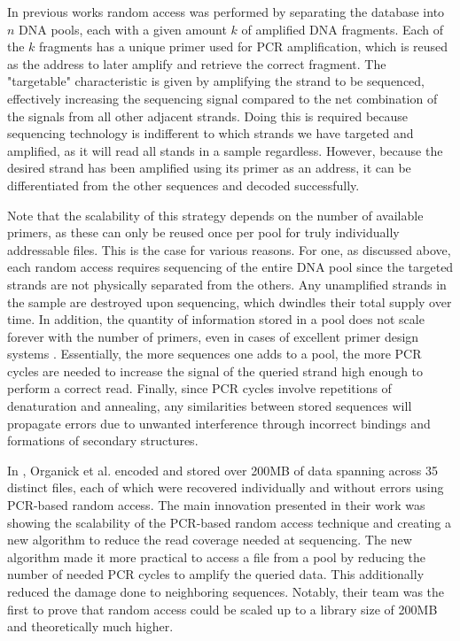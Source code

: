 \documentclass[a4paper,conference]{IEEEtran}
\begin{document}
In previous works \cite{pcrbased} random access was performed by separating the database into $n$ DNA pools, each with a given amount $k$ of amplified DNA fragments. Each of the $k$ fragments has a unique primer used for PCR amplification, which is reused as the address to later amplify and retrieve the correct fragment. The "targetable" characteristic is given by amplifying the strand to be sequenced, effectively increasing the sequencing signal compared to the net combination of the signals from all other adjacent strands. Doing this is required because sequencing technology is indifferent to which strands we have targeted and amplified, as it will read all stands in a sample regardless. However, because the desired strand has been amplified using its primer as an address, it can be differentiated from the other sequences and decoded successfully.

Note that the scalability of this strategy depends on the number of available primers, as these can only be reused once per pool for truly individually addressable files. This is the case for various reasons. For one, as discussed above, each random access requires sequencing of the entire DNA pool since the targeted strands are not physically separated from the others. Any unamplified strands in the sample are destroyed upon sequencing, which dwindles their total supply over time. In addition, the quantity of information stored in a pool does not scale forever with the number of primers, even in cases of excellent primer design systems \cite{}. Essentially, the more sequences one adds to a pool, the more PCR cycles are needed to increase the signal of the queried strand high enough to perform a correct read. Finally, since PCR cycles involve repetitions of denaturation and annealing, any similarities between stored sequences will propagate errors due to unwanted interference through incorrect bindings and formations of secondary structures.

In \cite{pcrbased}, Organick et al. encoded and stored over 200MB of data spanning across 35 distinct files, each of which were recovered individually and without errors using PCR-based random access. The main innovation presented in their work was showing the scalability of the PCR-based random access technique and creating a new algorithm to reduce the read coverage needed at sequencing. The new algorithm made it more practical to access a file from a pool by reducing the number of needed PCR cycles to amplify the queried data. This additionally reduced the damage done to neighboring sequences. Notably, their team was the first to prove that random access could be scaled up to a library size of 200MB and theoretically much higher.
\end{document}
